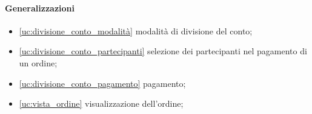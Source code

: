 \paragraph{Generalizzazioni}
\begin{itemize}
	\item \autoref{uc:divisione_conto_modalità} modalità di divisione del conto;
	\item \autoref{uc:divisione_conto_partecipanti} selezione dei partecipanti
	      nel pagamento di un ordine;
	\item \autoref{uc:divisione_conto_pagamento} pagamento;
	\item \autoref{uc:vista_ordine} visualizzazione dell'ordine;
\end{itemize}
